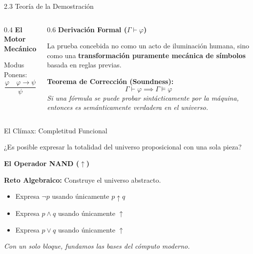 \documentclass[10pt, aspectratio=169]{beamer}
\begin{document}
\begin{frame}{2.3 Teoría de la Demostración}
    \begin{columns}
        \begin{column}{0.4\textwidth}
            \textbf{El Motor Mecánico}
            \vspace{0.5cm}
            
            \large
            Modus Ponens:
            \begin{equation*}
                \frac{\varphi \quad \varphi \to \psi}{\psi}
            \end{equation*}
        \end{column}
        \begin{column}{0.6\textwidth}
            \textbf{Derivación Formal ($\Gamma \vdash \varphi$)}
            
            \vspace{0.3cm}
            \small La prueba concebida no como un acto de iluminación humana, sino como una \textbf{transformación puramente mecánica de símbolos} basada en reglas previas.
            
            \vspace{0.6cm}
            \alert{\textbf{Teorema de Corrección (Soundness):}}
            \begin{equation*}
                \Gamma \vdash \varphi \implies \Gamma \models \varphi
            \end{equation*}
            \footnotesize \textit{Si una fórmula se puede probar sintácticamente por la máquina, entonces es semánticamente verdadera en el universo.}
        \end{column}
    \end{columns}
\end{frame}

\begin{frame}{El Clímax: Completitud Funcional}
    \begin{center}
        \Large
        ¿Es posible expresar la totalidad del universo proposicional con una sola pieza?
        
        \vspace{0.5cm}
        \alert{\textbf{El Operador NAND ($\uparrow$)}}
    \end{center}
    
    \vspace{0.5cm}
    \textbf{Reto Algebraico:} Construye el universo abstracto.
    \begin{itemize}
        \item Expresa $\neg p$ usando únicamente $p \uparrow q$
        \item Expresa $p \land q$ usando únicamente $\uparrow$
        \item Expresa $p \lor q$ usando únicamente $\uparrow$
    \end{itemize}
    
    \vspace{0.5cm}
    \begin{center}
        \textit{Con un solo bloque, fundamos las bases del cómputo moderno.}
    \end{center}
\end{frame}
\end{document}
